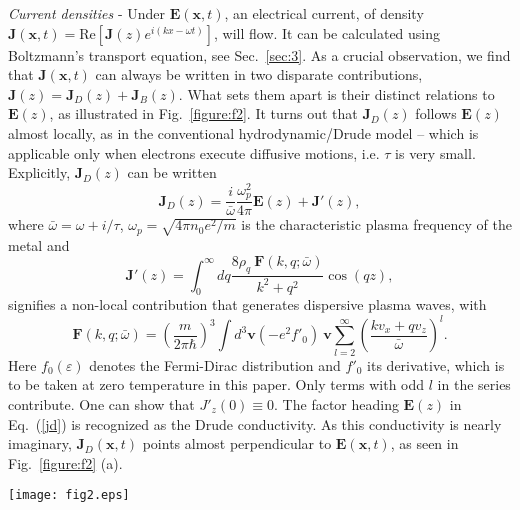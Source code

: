 \documentclass[aps,reprint]{revtex4-1}
\begin{document}
\textit{Current densities} - Under $\mathbf{E}(\mathbf{x},t)$, an electrical current, of density $\mathbf{J}(\mathbf{x},t) = \mbox{Re}\left[\mathbf{J}(z)e^{i(kx-\omega t)}\right]$, will flow. It can be calculated using Boltzmann's transport equation, see Sec.~\ref{sec:3}. As a crucial observation, we find that $\mathbf{J}(\mathbf{x},t)$ can always be written in two disparate contributions, $\mathbf{J}(z) = \mathbf{J}_D(z) + \mathbf{J}_B(z)$. What sets them apart is their distinct relations to $\mathbf{E}(z)$, as illustrated in Fig.~\ref{figure:f2}. It turns out that $\mathbf{J}_D(z)$ follows $\mathbf{E}(z)$ almost locally, as in the conventional hydrodynamic/Drude model -- which is applicable only when electrons execute diffusive motions, i.e. $\tau$ is very small. Explicitly, $\mathbf{J}_D(z)$ can be written 
\begin{equation}
\mathbf{J}_D(z) = \frac{i}{\bar{\omega}}\frac{\omega^2_p}{4\pi} \mathbf{E}(z) + \mathbf{J}'(z), \label{jd}
\end{equation}
where $\bar{\omega} = \omega + i/\tau$, $\omega_p = \sqrt{4\pi n_0e^2/m}$ is the characteristic plasma frequency of the metal and 
\begin{equation}
\mathbf{J}'(z) = \int^{\infty}_0 dq \frac{8 \rho_q~\mathbf{F}(k,q;\bar{\omega})}{k^2+q^2} \cos(qz),  
\end{equation}
signifies a non-local contribution that generates dispersive plasma waves, with $$\mathbf{F}(k,q;\bar{\omega}) = \left(\frac{m}{2\pi\hbar}\right)^3
 \int d^3\mathbf{v} (-e^2f'_0)~\mathbf{v}\sum^{\infty}_{l=2}\left(\frac{kv_x+qv_z}{\bar{\omega}}\right)^l.$$
Here $f_0(\varepsilon)$ denotes the Fermi-Dirac distribution and $f'_0$ its derivative, which is to be taken at zero temperature in this paper. Only terms with odd $l$ in the series contribute. One can show that $J'_z(0)\equiv 0$. The factor heading $\mathbf{E}(z)$ in Eq.~(\ref{jd}) is recognized as the Drude conductivity. As this conductivity is nearly imaginary, $\mathbf{J}_D(\mathbf{x},t)$ points almost perpendicular to $\mathbf{E}(\mathbf{x},t)$, as seen in Fig.~\ref{figure:f2} (a).  

\begin{figure*}
\begin{center}
\texttt{[image: fig2.eps]}
\end{center}
\caption{Snapshots of (a) diffusive current density $\mathbf{J}_{D}(\mathbf{x},t)$ and (b) surface-ballistic current density $\mathbf{J}_B(\mathbf{x},t)$ in SPWs. These two current densities are not discriminated by the value of $\tau$, but by their dependence on the surface. $\mathbf{J}_B$ signifies genuine surface effects and would totally disappear without the surface, while $\mathbf{J}_D$ is a bulk property. $k/k_s = 0.1$ and $p=1$. Im$(\bar{\omega})$ has been neglected to emphasize the differences. \label{figure:f2}}
\end{figure*} 
\end{document}
